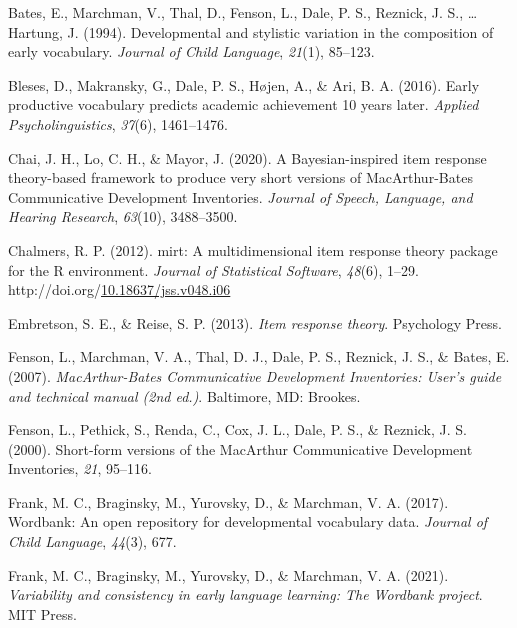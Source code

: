 \documentclass[10pt, letterpaper]{article}
\begin{document}
\leavevmode{}%
Bates, E., Marchman, V., Thal, D., Fenson, L., Dale, P. S., Reznick, J.
S., \ldots{} Hartung, J. (1994). Developmental and stylistic variation
in the composition of early vocabulary. \emph{Journal of Child
Language}, \emph{21}(1), 85--123.

\leavevmode{}%
Bleses, D., Makransky, G., Dale, P. S., Højen, A., \& Ari, B. A. (2016).
Early productive vocabulary predicts academic achievement 10 years
later. \emph{Applied Psycholinguistics}, \emph{37}(6), 1461--1476.

\leavevmode{}%
Chai, J. H., Lo, C. H., \& Mayor, J. (2020). A {B}ayesian-inspired item
response theory-based framework to produce very short versions of
{M}ac{A}rthur-{B}ates {C}ommunicative {D}evelopment {I}nventories.
\emph{Journal of Speech, Language, and Hearing Research}, \emph{63}(10),
3488--3500.

\leavevmode{}%
Chalmers, R. P. (2012). {mirt}: A multidimensional item response theory
package for the {R} environment. \emph{Journal of Statistical Software},
\emph{48}(6), 1--29.
http://doi.org/\href{https://doi.org/10.18637/jss.v048.i06}{10.18637/jss.v048.i06}

\leavevmode{}%
Embretson, S. E., \& Reise, S. P. (2013). \emph{Item response theory}.
Psychology Press.

\leavevmode{}%
Fenson, L., Marchman, V. A., Thal, D. J., Dale, P. S., Reznick, J. S.,
\& Bates, E. (2007). \emph{{M}ac{A}rthur-{B}ates {C}ommunicative
{D}evelopment {I}nventories: User's guide and technical manual (2nd
ed.)}. Baltimore, MD: Brookes.

\leavevmode{}%
Fenson, L., Pethick, S., Renda, C., Cox, J. L., Dale, P. S., \& Reznick,
J. S. (2000). Short-form versions of the {M}ac{A}rthur {C}ommunicative
{D}evelopment {I}nventories, \emph{21}, 95--116.

\leavevmode{}%
Frank, M. C., Braginsky, M., Yurovsky, D., \& Marchman, V. A. (2017).
Wordbank: An open repository for developmental vocabulary data.
\emph{Journal of Child Language}, \emph{44}(3), 677.

\leavevmode{}%
Frank, M. C., Braginsky, M., Yurovsky, D., \& Marchman, V. A. (2021).
\emph{Variability and consistency in early language learning: The
{Wordbank} project}. MIT Press.
\end{document}
